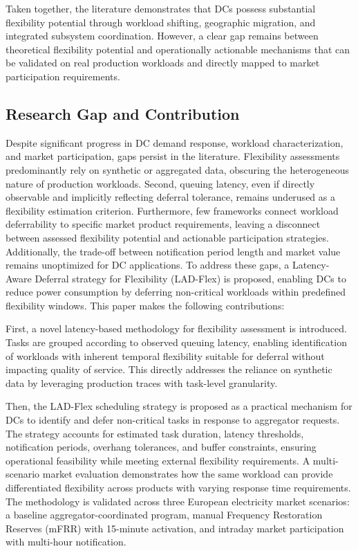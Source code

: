 \documentclass[preprint,12pt]{elsarticle}
\begin{document}
Taken together, the literature demonstrates that DCs possess substantial flexibility potential through workload shifting, geographic migration, and integrated subsystem coordination. However, a clear gap remains between theoretical flexibility potential and operationally actionable mechanisms that can be validated on real production workloads and directly mapped to market participation requirements.





\subsection{Research Gap and Contribution}
\label{sec:research_gap}

Despite significant progress in DC demand response, workload characterization, and market participation, gaps persist in the literature. Flexibility assessments predominantly rely on synthetic or aggregated data, obscuring the heterogeneous nature of production workloads. Second, queuing latency, even if directly observable and implicitly reflecting deferral tolerance, remains underused as a flexibility estimation criterion. Furthermore, few frameworks connect workload deferrability to specific market product requirements, leaving a disconnect between assessed flexibility potential and actionable participation strategies. Additionally, the trade-off between notification period length and market value remains unoptimized for DC applications. To address these gaps, a Latency-Aware Deferral strategy for Flexibility (LAD-Flex) is proposed, enabling DCs to reduce power consumption by deferring non-critical workloads within predefined flexibility windows. This paper makes the following contributions:

First, a novel latency-based methodology for flexibility assessment is introduced. Tasks are grouped according to observed queuing latency, enabling identification of workloads with inherent temporal flexibility suitable for deferral without impacting quality of service. This directly addresses the reliance on synthetic data by leveraging production traces with task-level granularity.

Then, the LAD-Flex scheduling strategy is proposed as a practical mechanism for DCs to identify and defer non-critical tasks in response to aggregator requests. The strategy accounts for estimated task duration, latency thresholds, notification periods, overhang tolerances, and buffer constraints, ensuring operational feasibility while meeting external flexibility requirements. A multi-scenario market evaluation demonstrates how the same workload can provide differentiated flexibility across products with varying response time requirements. The methodology is validated across three European electricity market scenarios: a baseline aggregator-coordinated program, manual Frequency Restoration Reserves (mFRR) with 15-minute activation, and intraday market participation with multi-hour notification.
\end{document}
